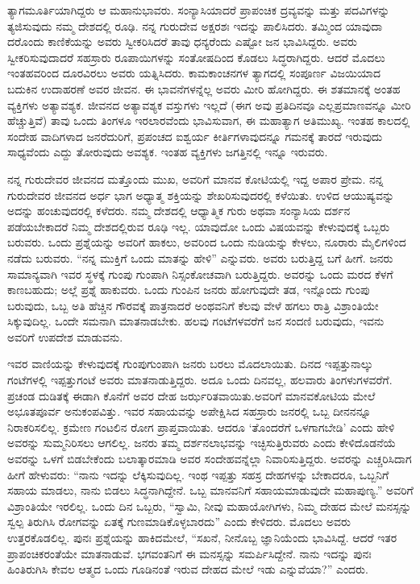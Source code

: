 ತ್ಯಾಗಮೂರ್ತಿಯಾಗಿದ್ದರು ಆ ಮಹಾನುಭಾವರು. ಸಂನ್ಯಾಸಿಯಾದರೆ ಪ್ರಾಪಂಚಿಕ ದ್ರವ್ಯವನ್ನು ಮತ್ತು ಪದವಿಗಳನ್ನು ತ್ಯಜಿಸುವುದು ನಮ್ಮ ದೇಶದಲ್ಲಿ ರೂಢಿ. ನನ್ನ ಗುರುದೇವ ಅಕ್ಷರಶಃ ಇದನ್ನು ಪಾಲಿಸಿದರು. ತಮ್ಮಿಂದ ಯಾವುದಾ ದರೊಂದು ಕಾಣಿಕೆಯನ್ನು ಅವರು ಸ್ವೀಕರಿಸಿದರೆ ತಾವು ಧನ್ಯರೆಂದು ಎಷ್ಟೋ ಜನ ಭಾವಿಸಿದ್ದರು. ಅವರು ಸ್ವೀಕರಿಸುವುದಾದರೆ ಸಹಸ್ರಾರು ರೂಪಾಯಿಗಳನ್ನು ಸಂತೋಷದಿಂದ ಕೊಡಲು ಸಿದ್ಧರಾಗಿದ್ದರು. ಆದರೆ ಮೊದಲು ಇಂತಹವರಿಂದ ದೂರವಿರಲು ಅವರು ಯತ್ನಿಸಿದರು. ಕಾಮಕಾಂಚನಗಳ ತ್ಯಾಗದಲ್ಲಿ ಸಂಪೂರ್ಣ ವಿಜಯಿಯಾದ ಬದುಕಿನ ಉದಾಹರಣೆ ಅವರ ಜೀವನ. ಈ ಭಾವನೆಗಳನ್ನೆಲ್ಲ ಅವರು ಮೀರಿ ಹೋಗಿದ್ದರು. ಈ ಶತಮಾನಕ್ಕೆ ಅಂತಹ ವ್ಯಕ್ತಿಗಳು ಅತ್ಯಾವಶ್ಯಕ. ಜೀವನದ ಅತ್ಯಾವಶ್ಯಕ ವಸ್ತುಗಳು ಇಲ್ಲದೆ (ಈಗ ಅವು ಪ್ರತಿದಿನವೂ ಎಲ್ಲಪ್ರಮಾಣವನ್ನೂ ಮೀರಿ ಹೆಚ್ಚುತ್ತಿವೆ) ತಾವು ಒಂದು ತಿಂಗಳೂ ಇರಲಾರವೆಂದು ಭಾವಿಸುವಾಗ, ಈ ಮಹಾತ್ಯಾಗ ಅತಿಮುಖ್ಯ. ಇಂತಹ ಕಾಲದಲ್ಲಿ ಸಂದೇಹ ವಾದಿಗಳಾದ ಜನರೆದುರಿಗೆ, ಪ್ರಪಂಚದ ಐಶ್ವರ್ಯ ಕೀರ್ತಿಗಳಾವುದನ್ನೂ ಗಮನಕ್ಕೆ ತಾರದೆ ಇರುವುದು ಸಾಧ್ಯವೆಂದು ಎದ್ದು ತೋರುವುದು ಅವಶ್ಯಕ. ಇಂತಹ ವ್ಯಕ್ತಿಗಳು ಜಗತ್ತಿನಲ್ಲಿ ಇನ್ನೂ ಇರುವರು.

ನನ್ನ ಗುರುದೇವರ ಜೀವನದ ಮತ್ತೊಂದು ಮುಖ, ಅವರಿಗೆ ಮಾನವ ಕೋಟಿಯಲ್ಲಿ ಇದ್ದ ಅಪಾರ ಪ್ರೇಮ. ನನ್ನ ಗುರುದೇವರ ಜೀವನದ ಅರ್ಧ ಭಾಗ ಅಧ್ಯಾತ್ಮ ಶಕ್ತಿಯನ್ನು ಶೇಖರಿಸುವುದರಲ್ಲಿ ಕಳೆಯಿತು. ಉಳಿದ ಆಯುಷ್ಯವನ್ನು ಅದನ್ನು ಹಂಚುವುದರಲ್ಲಿ ಕಳೆದರು. ನಮ್ಮ ದೇಶದಲ್ಲಿ ಆಧ್ಯಾತ್ಮಿಕ ಗುರು ಅಥವಾ ಸಂನ್ಯಾಸಿಯ ದರ್ಶನ ಪಡೆಯಬೇಕಾದರೆ ನಿಮ್ಮ ದೇಶದಲ್ಲಿರುವ ರೂಢಿ ಇಲ್ಲ. ಯಾವುದೋ ಒಂದು ವಿಷಯವನ್ನು ಕೇಳುವುದಕ್ಕೆ ಒಬ್ಬರು ಬರುವರು. ಒಂದು ಪ್ರಶ್ನೆಯನ್ನು ಅವರಿಗೆ ಹಾಕಲು, ಅವರಿಂದ ಒಂದು ನುಡಿಯನ್ನು ಕೇಳಲು, ನೂರಾರು ಮೈಲಿಗಳಿಂದ ನಡೆದು ಬರುವರು. “ನನ್ನ ಮುಕ್ತಿಗೆ ಒಂದು ಮಾತನ್ನು ಹೇಳಿ” ಎನ್ನುವರು. ಅವರು ಬರುತ್ತಿದ್ದ ಬಗೆ ಹೀಗೆ. ಜನರು ಸಾಮಾನ್ಯವಾಗಿ ಇವರ ಸ್ಥಳಕ್ಕೆ ಗುಂಪು ಗುಂಪಾಗಿ ನಿಸ್ಸಂಕೋಚವಾಗಿ ಬರುತ್ತಿದ್ದರು. ಅವರನ್ನು ಒಂದು ಮರದ ಕೆಳಗೆ ಕಾಣಬಹುದು; ಅಲ್ಲೆ ಪ್ರಶ್ನೆ ಹಾಕುವರು. ಒಂದು ಗುಂಪಿನ ಜನರು ಹೋಗುವುದೇ ತಡ, ಇನ್ನೊಂದು ಗುಂಪು ಬರುವುದು, ಒಬ್ಬ ಅತಿ ಹೆಚ್ಚಿನ ಗೌರವಕ್ಕೆ ಪಾತ್ರನಾದರೆ ಅಂಥವನಿಗೆ ಕೆಲವು ವೇಳೆ ಹಗಲು ರಾತ್ರಿ ವಿಶ್ರಾಂತಿಯೇ ಸಿಕ್ಕುವುದಿಲ್ಲ. ಒಂದೇ ಸಮನಾಗಿ ಮಾತನಾಡಬೇಕು. ಹಲವು ಗಂಟೆಗಳವರೆಗೆ ಜನ ಸಂದಣಿ ಬರುವುದು, ಇವನು ಅವರಿಗೆ ಉಪದೇಶ ಮಾಡುವನು.

ಇವರ ವಾಣಿಯನ್ನು ಕೇಳುವುದಕ್ಕೆ ಗುಂಪುಗುಂಪಾಗಿ ಜನರು ಬರಲು ಮೊದಲಾಯಿತು. ದಿನದ ಇಪ್ಪತ್ತುನಾಲ್ಕು ಗಂಟೆಗಳಲ್ಲಿ ಇಪ್ಪತ್ತುಗಂಟೆ ಅವರು ಮಾತನಾಡುತ್ತಿದ್ದರು. ಅದೂ ಒಂದು ದಿನವಲ್ಲ, ಹಲವಾರು ತಿಂಗಳುಗಳವರೆಗೆ. ಪ್ರಚಂಡ ದುಡಿತಕ್ಕೆ ಈಡಾಗಿ ಕೊನೆಗೆ ಅವರ ದೇಹ ಜರ್ಝರಿತವಾಯಿತು.ಅವರಿಗೆ ಮಾನವಕೋಟಿಯ ಮೇಲೆ ಅಭೂತಪೂರ್ವ ಅನುಕಂಪವಿತ್ತು. ಇವರ ಸಹಾಯವನ್ನು ಅಪೇಕ್ಷಿಸಿದ ಸಹಸ್ರಾರು ಜನರಲ್ಲಿ ಒಬ್ಬ ದೀನನನ್ನೂ ನಿರಾಕರಿಸಲಿಲ್ಲ. ಕ್ರಮೇಣ ಗಂಟಲಿನ ರೋಗ ಪ್ರಾಪ್ತವಾಯಿತು. ಆದರೂ ‘ತೊಂದರೆಗೆ ಒಳಗಾಗಬೇಡಿ’ ಎಂದು ಹೇಳಿ ಅವರನ್ನು ಸುಮ್ಮನಿರಿಸಲು ಆಗಲಿಲ್ಲ. ಜನರು ತಮ್ಮ ದರ್ಶನಲಾಭವನ್ನು ಇಚ್ಛಿಸುತ್ತಿರುವರು ಎಂದು ಕೇಳಿದೊಡನೆಯೆ ಅವರನ್ನು ಒಳಗೆ ಬಿಡಬೇಕೆಂದು ಬಲಾತ್ಕಾರಮಾಡಿ ಅವರ ಸಂದೇಹವನ್ನೆಲ್ಲಾ ನಿವಾರಿಸುತ್ತಿದ್ದರು. ಅವರನ್ನು ಎಚ್ಚರಿಸಿದಾಗ ಹೀಗೆ ಹೇಳುವರು: “ನಾನು ಇದನ್ನು ಲೆಕ್ಕಿಸುವುದಿಲ್ಲ. ಇಂಥ ಇಪ್ಪತ್ತು ಸಹಸ್ರ ದೇಹಗಳನ್ನು ಬೇಕಾದರೂ, ಒಬ್ಬನಿಗೆ ಸಹಾಯ ಮಾಡಲು, ನಾನು ಬಿಡಲು ಸಿದ್ಧನಾಗಿದ್ದೇನೆ. ಒಬ್ಬ ಮಾನವನಿಗೆ ಸಹಾಯಮಾಡುವುದೇ ಮಹಾಪುಣ್ಯ.” ಅವರಿಗೆ ವಿಶ್ರಾಂತಿಯೇ ಇರಲಿಲ್ಲ. ಒಂದು ದಿನ ಒಬ್ಬರು, “ಸ್ವಾಮಿ, ನೀವು ಮಹಾಯೋಗಿಗಳು, ನಿಮ್ಮ ದೇಹದ ಮೇಲೆ ಮನಸ್ಸನ್ನು ಸ್ವಲ್ಪ ತಿರುಗಿಸಿ ರೋಗವನ್ನು ಏತಕ್ಕೆ ಗುಣಮಾಡಿಕೊಳ್ಳಬಾರದು” ಎಂದು ಕೇಳಿದರು. ಮೊದಲು ಅವರು ಉತ್ತರಕೊಡಲಿಲ್ಲ. ಪುನಃ ಪ್ರಶ್ನೆಯನ್ನು ಹಾಕಿದಮೇಲೆ, “ಸಖನೆ, ನೀನೊಬ್ಬ ಜ್ಞಾನಿಯೆಂದು ಭಾವಿಸಿದ್ದೆ. ಆದರೆ ಇತರ ಪ್ರಾಪಂಚಿಕರಂತೆಯೇ ಮಾತನಾಡುವೆ. ಭಗವಂತನಿಗೆ ಈ ಮನಸ್ಸನ್ನು ಸಮರ್ಪಿಸಿದ್ದೇನೆ. ನಾನು ಇದನ್ನು ಪುನಃ ಹಿಂತಿರುಗಿಸಿ ಕೇವಲ ಆತ್ಮದ ಒಂದು ಗೂಡಿನಂತೆ ಇರುವ ದೇಹದ ಮೇಲೆ ಇಡು ಎನ್ನುವೆಯಾ?” ಎಂದರು.

